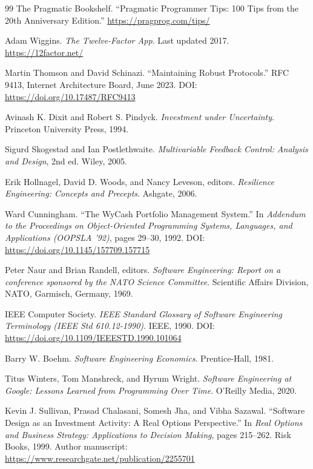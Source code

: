 \documentclass[11pt,a4paper]{ctexart}
\numberwithin{equation}{section}
\theoremstyle{definition}
\theoremstyle{plain}
\begin{document}
\begin{thebibliography}{99}
The Pragmatic Bookshelf.
\newblock ``Pragmatic Programmer Tips: 100 Tips from the 20th Anniversary Edition.''
\newblock \url{https://pragprog.com/tips/}

Adam Wiggins.
\newblock \textit{The Twelve-Factor App}.
\newblock Last updated 2017.
\newblock \url{https://12factor.net/}

Martin Thomson and David Schinazi.
\newblock ``Maintaining Robust Protocols.''
\newblock RFC 9413, Internet Architecture Board, June 2023.
\newblock DOI: \url{https://doi.org/10.17487/RFC9413}

Avinash K. Dixit and Robert S. Pindyck.
\newblock \textit{Investment under Uncertainty}.
\newblock Princeton University Press, 1994.

Sigurd Skogestad and Ian Postlethwaite.
\newblock \textit{Multivariable Feedback Control: Analysis and Design}, 2nd ed.
\newblock Wiley, 2005.

Erik Hollnagel, David D. Woods, and Nancy Leveson, editors.
\newblock \textit{Resilience Engineering: Concepts and Precepts}.
\newblock Ashgate, 2006.

Ward Cunningham.
\newblock ``The WyCash Portfolio Management System.''
\newblock In \textit{Addendum to the Proceedings on Object-Oriented Programming Systems, Languages, and Applications (OOPSLA '92)}, pages 29--30, 1992.
\newblock DOI: \url{https://doi.org/10.1145/157709.157715}

Peter Naur and Brian Randell, editors.
\newblock \textit{Software Engineering: Report on a conference sponsored by the NATO Science Committee}.
\newblock Scientific Affairs Division, NATO, Garmisch, Germany, 1969.

IEEE Computer Society.
\newblock \textit{IEEE Standard Glossary of Software Engineering Terminology (IEEE Std 610.12-1990)}.
\newblock IEEE, 1990.
\newblock DOI: \url{https://doi.org/10.1109/IEEESTD.1990.101064}

Barry W. Boehm.
\newblock \textit{Software Engineering Economics}.
\newblock Prentice-Hall, 1981.

Titus Winters, Tom Manshreck, and Hyrum Wright.
\newblock \textit{Software Engineering at Google: Lessons Learned from Programming Over Time}.
\newblock O'Reilly Media, 2020.

Kevin J. Sullivan, Prasad Chalasani, Somesh Jha, and Vibha Sazawal.
\newblock ``Software Design as an Investment Activity: A Real Options Perspective.''
\newblock In \textit{Real Options and Business Strategy: Applications to Decision Making}, pages 215--262. Risk Books, 1999.
\newblock Author manuscript: \url{https://www.researchgate.net/publication/2255701}


\end{thebibliography}
\end{document}
